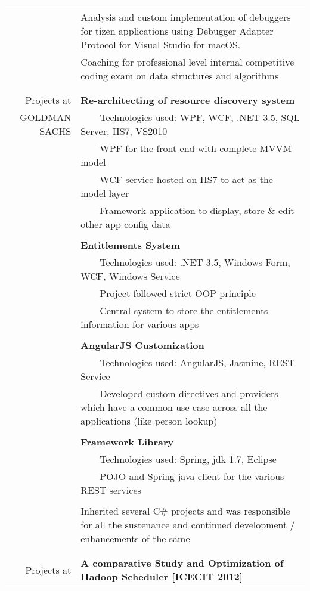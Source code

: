 \documentclass[a4paper,10pt]{article} %
\newcommand{\tabitem}{~~\llap{\textbullet}~~}
\begin{document}
\begin{tabular}{rp{13cm}}
&\\
& Analysis and custom implementation of debuggers for tizen applications using Debugger Adapter Protocol for Visual Studio for macOS.  
\\
& Coaching for professional level internal competitive coding exam on data 
structures and algorithms \\
&\\
&\\
Projects at  &  \textbf{Re-architecting of resource discovery system} \\
GOLDMAN SACHS &  \tabitem Technologies used: WPF, WCF, .NET 3.5, SQL Server, IIS7, VS2010 \\
& \tabitem WPF for the front end with complete MVVM model\\
& \tabitem WCF service hosted on IIS7 to act as the model layer\\
& \tabitem Framework application to display, store \& edit other app config data \\
&\\
& \textbf{Entitlements System}\\
& \tabitem Technologies used: .NET 3.5, Windows Form, WCF, Windows Service\\
& \tabitem Project followed strict OOP principle\\
& \tabitem Central system to store the entitlements information for various apps\\
&\\
& \textbf{AngularJS Customization} \\
& \tabitem Technologies used: AngularJS, Jasmine, REST Service\\
& \tabitem Developed custom directives and providers which have a common use case across all the applications (like person lookup) \\ 
&\\
& \textbf{Framework Library} \\
& \tabitem Technologies used: Spring, jdk 1.7, Eclipse\\
& \tabitem POJO and Spring java client for the various REST services \\ 
&\\
& Inherited several C\# projects and was responsible for all the sustenance and continued development / enhancements of the same\\
&\\
&\\
Projects at & \textbf{A comparative Study and Optimization of Hadoop Scheduler [ICECIT 2012]}\\ 

\end{tabular}
\end{document}
